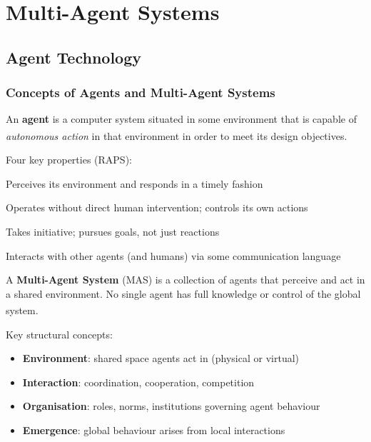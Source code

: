 \chapter{Multi-Agent Systems}

\section{Agent Technology}

\subsection{Concepts of Agents and Multi-Agent Systems}
\begin{tcbitemize}[ skin=sectionraster ]

    \tcbitem[title=What is an Agent?, raster multicolumn=3]
    An \textbf{agent} is a computer system situated in some environment that is
    capable of \emph{autonomous action} in that environment in order to meet its
    design objectives.\textsuperscript{\cite[][p.~28]{wooldridgeIntroductionMultiAgentSystems2009}}

    Four key properties (RAPS):
    \begin{description}[leftmargin=0.6cm, labelindent=0pt]
        \item[\textbf{Reactivity}] Perceives its environment and responds in a timely fashion
        \item[\textbf{Autonomy}] Operates without direct human intervention; controls its own actions
        \item[\textbf{Proactivity}] Takes initiative; pursues goals, not just reactions
        \item[\textbf{Social ability}] Interacts with other agents (and humans) via some communication language
    \end{description}

    \tcbitem[title=Multi-Agent System (MAS), raster multicolumn=3]
    A \textbf{Multi-Agent System} (MAS) is a collection of agents that perceive
    and act in a shared environment. No single agent has full knowledge or control
    of the global
    system.\textsuperscript{\cite[][p.~2]{weissMultiagentSystems2013}}

    Key structural concepts:
    \begin{itemize}
        \item \textbf{Environment}: shared space agents act in (physical or virtual)
        \item \textbf{Interaction}: coordination, cooperation, competition
        \item \textbf{Organisation}: roles, norms, institutions governing agent behaviour
        \item \textbf{Emergence}: global behaviour arises from local interactions
    \end{itemize}


\end{tcbitemize}
